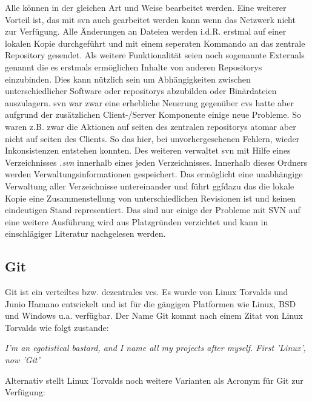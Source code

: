 Alle können in der gleichen Art und Weise bearbeitet werden. Eine weiterer
Vorteil ist, das mit \acrlong{svn} auch gearbeitet werden kann wenn das
Netzwerk nicht zur Verfügung. Alle Änderungen an Dateien werden i.d.R.  erstmal
auf einer lokalen Kopie durchgeführt und mit einem seperaten Kommando an das
zentrale Repository gesendet. Als weitere Funktionalität seien noch sogenannte
Externals genannt die es erstmals ermöglichen Inhalte von anderen Repositorys
einzubinden. Dies kann nützlich sein um Abhängigkeiten zwischen
unterschiedlicher Software oder \glspl{repository} abzubilden oder Binärdateien
auszulagern. \acrlong{svn} war zwar eine erhebliche Neuerung gegenüber
\acrlong{cvs} hatte aber aufgrund der zusätzlichen Client-/Server Komponente
einige neue Probleme. So waren z.B. zwar die Aktionen auf seiten des zentralen
\glspl{repository} atomar aber nicht auf seiten des Clients. So das hier, bei
unvorhergesehenen Fehlern, wieder Inkonsistenzen entstehen konnten.  Des
weiteren verwaltet \acrshort{svn} mit Hilfe eines Verzeichnisses \textit{.svn}
innerhalb eines jeden Verzeichnisses. Innerhalb dieses Ordners werden
Verwaltungsinformationen gespeichert. Das ermöglicht eine unabhängige
Verwaltung aller Verzeichnisse untereinander und führt ggf\. dazu das die
lokale Kopie eine Zusammenstellung von unterschiedlichen Revisionen ist und
keinen eindeutigen Stand representiert. Das sind nur einige der Probleme mit
SVN auf eine weitere Ausführung wird aus Platzgründen verzichtet und kann in
einschlägiger Literatur nachgelesen werden.\cite[s.~383-385]{cd}

\subsection{Git}\label{git}
Git ist ein verteiltes bzw. dezentrales \acrlong{vcs}. Es wurde von Linux
Torvalds und Junio Hamano entwickelt und ist für die gängigen Platformen wie
Linux, BSD und Windows u.a. verfügbar. Der Name Git kommt nach einem Zitat von
Linux Torvalds wie folgt zustande\cite{link:gitfaq}:

\begin{center}
\textit{\glqq{}I'm an egotistical bastard, and I name all my projects after
myself. First 'Linux', now 'Git'\grqq{}}\\
\end{center}

Alternativ stellt Linux Torvalds noch
weitere Varianten als Acronym für Git zur Verf\-ügung\cite{link:gitfaq}:

